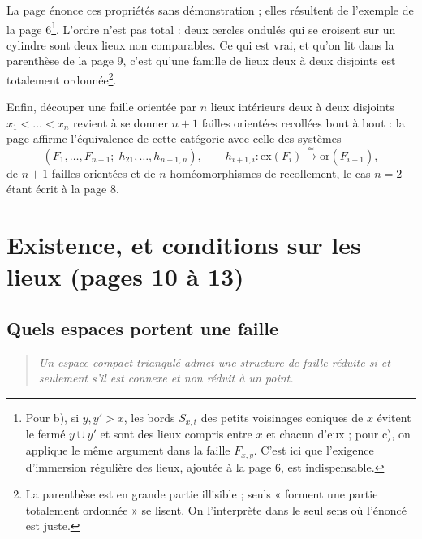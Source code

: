 \documentclass[11pt,a4paper]{article}
\begin{document}
La page énonce ces propriétés sans démonstration ; elles résultent de l'exemple
de la page 6\footnote{Pour b), si $y, y' > x$, les bords $S_{x,t}$ des petits
voisinages coniques de $x$ évitent le fermé $y \cup y'$ et sont des lieux compris
entre $x$ et chacun d'eux ; pour c), on applique le même argument dans la faille
$F_{x,y}$. C'est ici que l'exigence d'immersion régulière des lieux, ajoutée à la
page 6, est indispensable.}. L'ordre n'est pas total : deux cercles ondulés qui se
croisent sur un cylindre sont deux lieux non comparables. Ce qui est vrai, et
qu'on lit dans la parenthèse de la page 9, c'est qu'une famille de lieux deux à
deux disjoints est totalement ordonnée\footnote{La parenthèse est en grande
partie illisible ; seuls « forment une partie totalement ordonnée » se lisent. On
l'interprète dans le seul sens où l'énoncé est juste.}.

Enfin, découper une faille orientée par $n$ lieux intérieurs deux à deux disjoints
$x_{1} < \dots < x_{n}$ revient à se donner $n+1$ failles orientées recollées bout
à bout : la page affirme l'équivalence de cette catégorie avec celle des systèmes
\[
(F_{1}, \dots, F_{n+1};\; h_{21}, \dots, h_{n+1,n}), \qquad h_{i+1,i} :
\mathrm{ex}(F_{i}) \xrightarrow{\ \simeq\ } \mathrm{or}(F_{i+1}),
\]
de $n+1$ failles orientées et de $n$ homéomorphismes de recollement, le cas $n = 2$
étant écrit à la page 8.

\section*{Existence, et conditions sur les lieux (pages 10 à 13)}

\subsection*{Quels espaces portent une faille}

\begin{quote}
\emph{Un espace compact triangulé admet une structure de faille réduite si et
seulement s'il est connexe et non réduit à un point.}
\end{quote}
\end{document}
